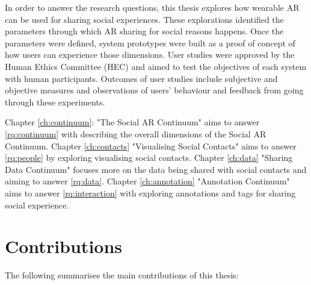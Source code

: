 In order to answer the research questions, this thesis explores how wearable AR can be used for sharing social experiences. These explorations identified the parameters through which AR sharing for social reasons happens. Once the parameters were defined, system prototypes were built as a proof of concept of how users can experience those dimensions. User studies were approved by the Human Ethics Committee (HEC) and aimed to test the objectives of each system with human participants. Outcomes of user studies include subjective and objective measures and observations of users' behaviour and feedback from going through these experiments. 

Chapter \ref{ch:continuum}: "The Social AR Continuum" aims to answer \ref{rq:continuum} with describing the overall dimensions of the Social AR Continuum. 
Chapter \ref{ch:contacts} "Visualising Social Contacts" aims to answer \ref{rq:people} by exploring visualising social contacts. 
Chapter \ref{ch:data} "Sharing Data Continuum" focuses more on the data being shared with social contacts and aiming to answer \ref{rq:data}.
Chapter \ref{ch:annotation} "Annotation Continuum" aims to answer \ref{rq:interaction} with exploring annotations and tags for sharing social experience. 

\section{Contributions}

The following summarises the main contributions of this thesis: 

